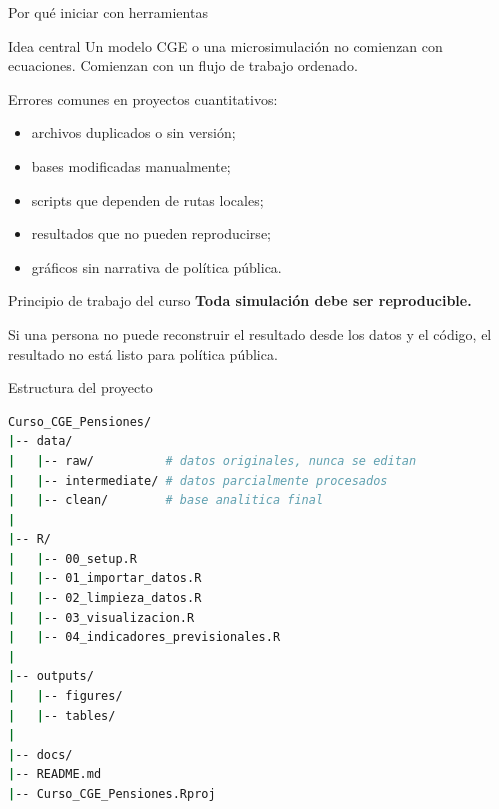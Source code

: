 \documentclass[aspectratio=169,11pt]{beamer}
\begin{document}
\begin{frame}{Por qué iniciar con herramientas}
\begin{block}{Idea central}
Un modelo CGE o una microsimulación no comienzan con ecuaciones. Comienzan con un flujo de trabajo ordenado.
\end{block}

\vspace{0.3cm}
Errores comunes en proyectos cuantitativos:
\begin{itemize}
  \item archivos duplicados o sin versión;
  \item bases modificadas manualmente;
  \item scripts que dependen de rutas locales;
  \item resultados que no pueden reproducirse;
  \item gráficos sin narrativa de política pública.
\end{itemize}
\end{frame}

\begin{frame}{Principio de trabajo del curso}
\centering
\Large
\textbf{Toda simulación debe ser reproducible.}

\vspace{0.6cm}
\normalsize
{}

\vspace{0.5cm}
\normalsize
Si una persona no puede reconstruir el resultado desde los datos y el código, el resultado no está listo para política pública.
\end{frame}

\begin{frame}[fragile]{Estructura del proyecto}
\begin{lstlisting}[language=bash]
Curso_CGE_Pensiones/
|-- data/
|   |-- raw/          # datos originales, nunca se editan
|   |-- intermediate/ # datos parcialmente procesados
|   |-- clean/        # base analitica final
|
|-- R/
|   |-- 00_setup.R
|   |-- 01_importar_datos.R
|   |-- 02_limpieza_datos.R
|   |-- 03_visualizacion.R
|   |-- 04_indicadores_previsionales.R
|
|-- outputs/
|   |-- figures/
|   |-- tables/
|
|-- docs/
|-- README.md
|-- Curso_CGE_Pensiones.Rproj
\end{lstlisting}
\end{frame}
\end{document}
